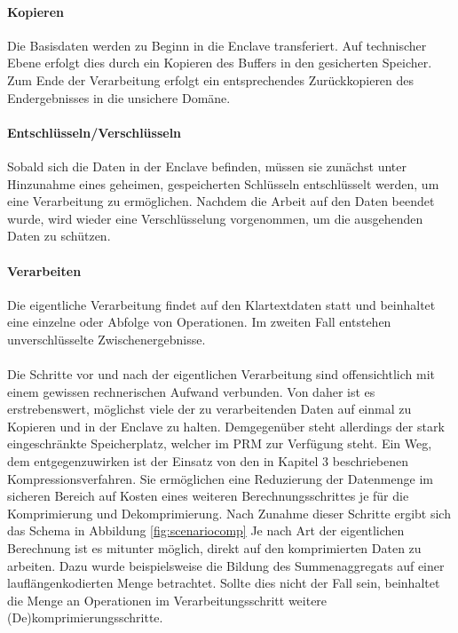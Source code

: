 \paragraph{Kopieren}
Die Basisdaten werden zu Beginn in die Enclave transferiert. Auf technischer Ebene erfolgt dies durch ein Kopieren des Buffers in den gesicherten Speicher. Zum Ende der Verarbeitung erfolgt ein entsprechendes Zurückkopieren des Endergebnisses in die unsichere Domäne.

\paragraph{Entschlüsseln/Verschlüsseln}
Sobald sich die Daten in der Enclave befinden, müssen sie zunächst unter Hinzunahme eines geheimen, gespeicherten Schlüsseln entschlüsselt werden, um eine Verarbeitung zu ermöglichen. Nachdem die Arbeit auf den Daten beendet wurde, wird wieder eine Verschlüsselung vorgenommen, um die ausgehenden Daten zu schützen.

\paragraph{Verarbeiten}
Die eigentliche Verarbeitung findet auf den Klartextdaten statt und beinhaltet eine einzelne oder Abfolge von Operationen. Im zweiten Fall entstehen unverschlüsselte Zwischenergebnisse.

\paragraph{}
Die Schritte vor und nach der eigentlichen Verarbeitung sind offensichtlich mit einem gewissen rechnerischen Aufwand verbunden. Von daher ist es erstrebenswert, möglichst viele der zu verarbeitenden Daten auf einmal zu Kopieren und in der Enclave zu halten. Demgegenüber steht allerdings der stark eingeschränkte Speicherplatz, welcher im \ac{PRM} zur Verfügung steht. Ein Weg, dem entgegenzuwirken ist der Einsatz von den in Kapitel 3 beschriebenen Kompressionsverfahren. Sie ermöglichen eine Reduzierung der Datenmenge im sicheren Bereich auf Kosten eines weiteren Berechnungsschrittes je für die Komprimierung und Dekomprimierung. Nach Zunahme dieser Schritte ergibt sich das Schema in Abbildung \ref{fig:scenariocomp} Je nach Art der eigentlichen Berechnung ist es mitunter möglich, direkt auf den komprimierten Daten zu arbeiten. Dazu wurde beispielsweise die Bildung des Summenaggregats auf einer lauflängenkodierten Menge betrachtet. Sollte dies nicht der Fall sein, beinhaltet die Menge an Operationen im Verarbeitungsschritt weitere (De)komprimierungsschritte.

